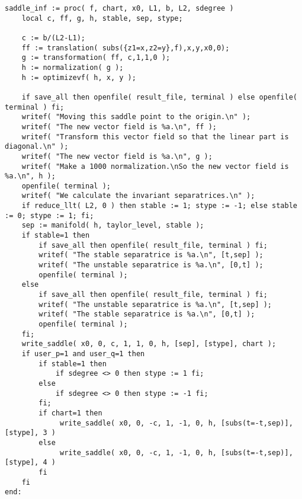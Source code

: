 \documentclass[a4paper,10pt]{article}
\begin{document}
\begin{lstlisting}[name=infinity]
saddle_inf := proc( f, chart, x0, L1, b, L2, sdegree )
    local c, ff, g, h, stable, sep, stype;

    c := b/(L2-L1);
    ff := translation( subs({z1=x,z2=y},f),x,y,x0,0);
    g := transformation( ff, c,1,1,0 );
    h := normalization( g );
    h := optimizevf( h, x, y );

    if save_all then openfile( result_file, terminal ) else openfile( terminal ) fi;
    writef( "Moving this saddle point to the origin.\n" );
    writef( "The new vector field is %a.\n", ff );
    writef( "Transform this vector field so that the linear part is diagonal.\n" );
    writef( "The new vector field is %a.\n", g );
    writef( "Make a 1000 normalization.\nSo the new vector field is %a.\n", h );
    openfile( terminal );
    writef( "We calculate the invariant separatrices.\n" );
    if reduce_llt( L2, 0 ) then stable := 1; stype := -1; else stable := 0; stype := 1; fi;
    sep := manifold( h, taylor_level, stable );
    if stable=1 then
        if save_all then openfile( result_file, terminal ) fi;
        writef( "The stable separatrice is %a.\n", [t,sep] );
        writef( "The unstable separatrice is %a.\n", [0,t] );
        openfile( terminal );
    else
        if save_all then openfile( result_file, terminal ) fi;
        writef( "The unstable separatrice is %a.\n", [t,sep] );
        writef( "The stable separatrice is %a.\n", [0,t] );
        openfile( terminal );
    fi;
    write_saddle( x0, 0, c, 1, 1, 0, h, [sep], [stype], chart );
    if user_p=1 and user_q=1 then
        if stable=1 then
            if sdegree <> 0 then stype := 1 fi;
        else
            if sdegree <> 0 then stype := -1 fi;
        fi;
        if chart=1 then
             write_saddle( x0, 0, -c, 1, -1, 0, h, [subs(t=-t,sep)], [stype], 3 )
        else
             write_saddle( x0, 0, -c, 1, -1, 0, h, [subs(t=-t,sep)], [stype], 4 )
        fi
    fi
end:
\end{lstlisting}
\end{document}
